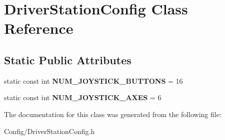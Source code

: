 \hypertarget{class_driver_station_config}{\section{\-Driver\-Station\-Config \-Class \-Reference}
\label{class_driver_station_config}
}
\subsection*{\-Static \-Public \-Attributes}
\begin{DoxyCompactItemize}
\item 
\hypertarget{class_driver_station_config_a38682d1a4d65e8831781953451173f32}{static const int {\bfseries \-N\-U\-M\-\_\-\-J\-O\-Y\-S\-T\-I\-C\-K\-\_\-\-B\-U\-T\-T\-O\-N\-S} = 16}\label{class_driver_station_config_a38682d1a4d65e8831781953451173f32}

\item 
\hypertarget{class_driver_station_config_ae65eb0493cc153b4eda7634cd02d3ac0}{static const int {\bfseries \-N\-U\-M\-\_\-\-J\-O\-Y\-S\-T\-I\-C\-K\-\_\-\-A\-X\-E\-S} = 6}\label{class_driver_station_config_ae65eb0493cc153b4eda7634cd02d3ac0}

\end{DoxyCompactItemize}


\-The documentation for this class was generated from the following file\-:\begin{DoxyCompactItemize}
\item 
\-Config/\-Driver\-Station\-Config.\-h\end{DoxyCompactItemize}
